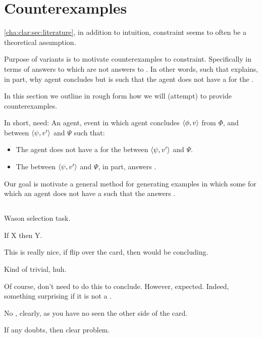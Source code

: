 \chapter{Counterexamples}
\label{cha:ces}

\begin{note}
  \autoref{cha:clar:sec:literature}, in addition to intuition, constraint seems to often be a theoretical assumption.

  Purpose of variants is to motivate counterexamples to constraint.
  Specifically in terms of answers to \qWhyV{} which are not answers to \qHowV{}.
  In other words, \ros{} such that \ros{} explains, in part, why agent concludes but is such that the agent does not have a \wit{} for the \ros{}.

  In this section we outline in rough form how we will (attempt) to provide counterexamples.

  In short, need:
  An agent, event in which agent concludes \(\langle \phi, v \rangle\) from \(\Phi\), and \ros{} between \(\langle \psi, v' \rangle\) and \(\Psi\) such that:

  \begin{itemize}
  \item
    The agent does not have a \wit{} for the \ros{} between \(\langle \psi, v' \rangle\) and \(\Psi\).
  \item
    The \ros{} between \(\langle \psi, v' \rangle\) and \(\Psi\), in part, answers \qWhyV{}.
  \end{itemize}

  Our goal is motivate a general method for generating examples in which some \ros{} for which an agent does not have a \wit{} such that the \ros{} answers \qWhyV{}.
\end{note}

\section{}
\label{sec:cscen1}

\begin{note}
  \begin{illustration}
    Wason selection task.

    If X then Y.
  \end{illustration}

  This is really nice, if flip over the card, then would be concluding.

  Kind of trivial, huh.

  Of course, don't need to do this to conclude.
  However, expected.
  Indeed, something surprising if it is not a \fc{}.

  No \wit{}, clearly, as you have no seen the other side of the card.

  If any doubts, then clear problem.
\end{note}


